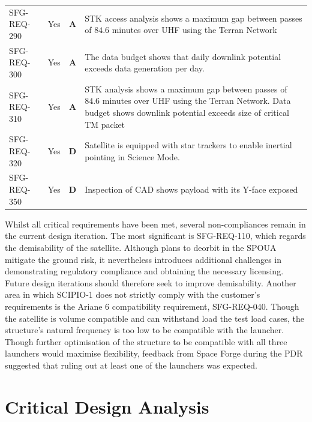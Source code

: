 \documentclass[a4paper, 11pt, conference]{IEEEtran}
\begin{document}
\begin{table}[!htbp]
\begin{tabularx}{\textwidth}{l c c X}
SFG-REQ-290 & Yes & \textbf{A} & STK access analysis shows a maximum gap between passes of $84.6$ minutes over UHF using the Terran Network \\
SFG-REQ-300 & Yes & \textbf{A} & The data budget shows that daily downlink potential exceeds data generation per day. \\
SFG-REQ-310 & Yes & \textbf{A} & STK analysis shows a maximum gap between passes of $84.6$ minutes over UHF using the Terran Network. Data budget shows downlink potential exceeds size of critical TM packet \\
SFG-REQ-320 & Yes & \textbf{D} & Satellite is equipped with star trackers to enable inertial pointing in Science Mode. \\
SFG-REQ-350 & Yes & \textbf{D} & Inspection of CAD shows payload with its Y-face exposed \\

\bottomrule
\end{tabularx}
\label{tab:critical_VM}
\end{table}

Whilst all critical requirements have been met, several non-compliances remain in the current design iteration. The most significant is SFG-REQ-110, which regards the demisability of the satellite. Although plans to deorbit in the SPOUA mitigate the ground risk, it nevertheless introduces additional challenges in demonstrating regulatory compliance and obtaining the necessary licensing. Future design iterations should therefore seek to improve demisability. Another area in which SCIPIO-1 does not strictly comply with the customer's requirements is the Ariane 6 compatibility requirement, SFG-REQ-040. Though the satellite is volume compatible and can withstand load the test load cases, the structure's natural frequency is too low to be compatible with the launcher. Though further optimisation of the structure to be compatible with all three launchers would maximise flexibility, feedback from Space Forge during the PDR\label{nom:pdr} suggested that ruling out at least one of the launchers was expected. 





\FloatBarrier
\section{Critical Design Analysis}\label{sec:crit_anal}
\end{document}

